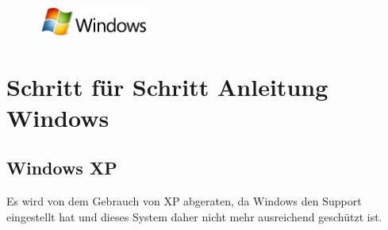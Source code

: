 \documentclass[a4paper,12pt]{scrartcl}
\begin{document}
\newpage
\enlargethispage{20pt}






\begin{figure}[h]
	\raggedleft
	\vspace{-20pt}
	\includegraphics[height=1cm,keepaspectratio]{Bilder/Windows_logo}
	\vspace{-30pt}
\end{figure}

\section*{Schritt für Schritt Anleitung Windows}
\subsection*{Windows XP}
Es wird von dem Gebrauch von XP abgeraten, da Windows den Support eingestellt hat und dieses System daher nicht mehr ausreichend geschützt ist. 
\end{document}
